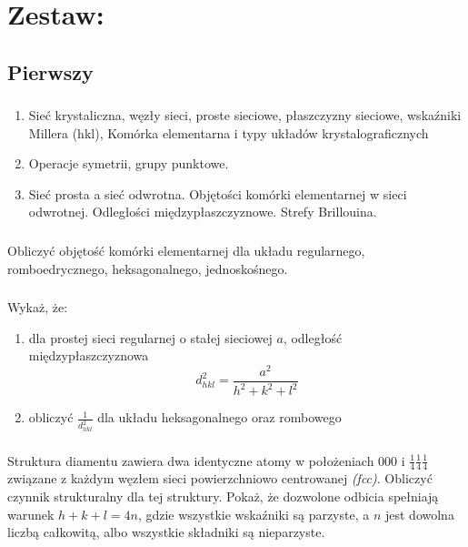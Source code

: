 \section{Zestaw:}
\subsection{Pierwszy}
\subsubsection{}
\begin{enumerate}
\item Sieć  krystaliczna, węzły sieci, proste sieciowe, płaszczyzny sieciowe, wskaźniki Millera (hkl), Komórka elementarna i  typy układów krystalograficznych
\item Operacje symetrii, grupy punktowe.
\item Sieć prosta a sieć odwrotna. Objętości komórki elementarnej w sieci odwrotnej. Odległości międzypłaszczyznowe. Strefy Brillouina.
\end{enumerate}


\subsubsection{}
Obliczyć objętość komórki elementarnej dla układu regularnego, romboedrycznego, heksagonalnego, jednoskośnego.

\subsubsection{}
Wykaż, że:
\begin{enumerate}
\item dla prostej sieci regularnej o stałej sieciowej $a$, odległość międzypłaszczyznowa \[d^2_{hkl} =\frac{a^2}{h^2+k^2+l^2}\] 
\item obliczyć $\frac{1}{d^2_{hkl}}$ dla układu heksagonalnego oraz rombowego
\end{enumerate}

\subsubsection{}
Struktura diamentu zawiera dwa identyczne atomy w położeniach $000$ i $\frac{1}{4}\frac{1}{4}\frac{1}{4}$ związane z każdym węzłem sieci powierzchniowo centrowanej \textit{(fcc)}. Obliczyć czynnik strukturalny dla tej struktury. Pokaż, że dozwolone odbicia spełniają warunek $h + k + l = 4n$, gdzie wszystkie wskaźniki są parzyste, a $n$ jest dowolna liczbą całkowitą, albo wszystkie składniki są nieparzyste.  

\newpage

